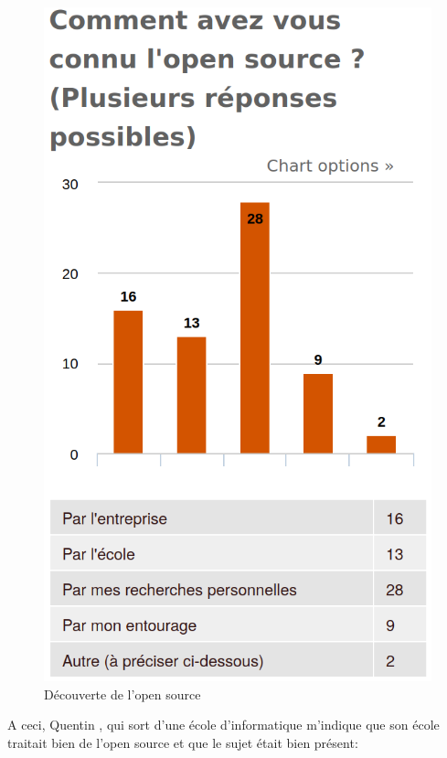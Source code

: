 				\begin{figure}[!htb]
					\center
					\includegraphics[scale=0.28]{./img/decouverte}
					\caption{Découverte de l'open source}
				\end{figure}

				A ceci, Quentin , qui sort d'une école d'informatique m'indique que son école traitait bien de l'open source et que le sujet était bien présent:

				\begin{center}
					\textit{
					}
				\end{center}

